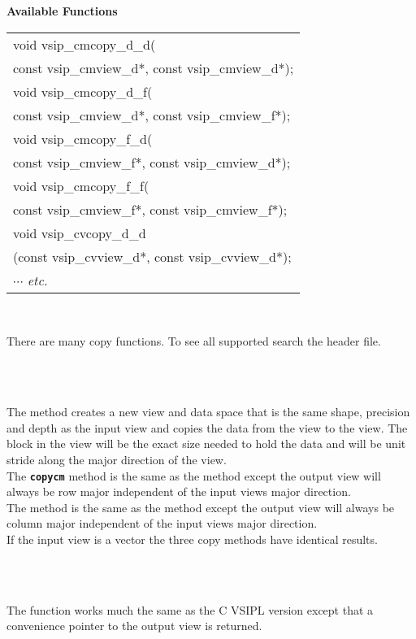 \\\cvsiplh
\\ \hspace*{.8cm} \vspace*{.1cm} \textbf{Available Functions }
\\ \hspace*{1cm} {\ttfamily
\begin{tabular}[H]{l}
void vsip\_cmcopy\_d\_d(\\*
\hspace{1cm}const vsip\_cmview\_d*, const vsip\_cmview\_d*);\\
void vsip\_cmcopy\_d\_f(\\*
\hspace{1cm}const vsip\_cmview\_d*, const vsip\_cmview\_f*);\\
void vsip\_cmcopy\_f\_d(\\*
\hspace{1cm}const vsip\_cmview\_f*, const vsip\_cmview\_d*);\\
void vsip\_cmcopy\_f\_f(\\*
\hspace{1cm}const vsip\_cmview\_f*, const vsip\_cmview\_f*);\\
void vsip\_cvcopy\_d\_d\\*
\hspace{1cm}(const vsip\_cvview\_d*, const vsip\_cvview\_d*);\\
$\cdots$  \emph{etc.} \end{tabular}
}
\\ \hspace*{1cm}
\parbox{11cm}{There are many copy functions. To see all supported search the  header file.\footnotemark}
\\\pyjvsiph
{}
\\\hspace*{1cm}\parbox{11cm}{The  method creates a new view and data space that is the same shape, precision and depth as the input view and copies the data from the  view to the  view. The block in the  view will be the exact size needed to hold the data and will be unit stride along the major direction of the  view.\\The {\texttt{\bfseries{copycm}}} method is the same as the  method except the output view will always be row major independent of the input views major direction.\\The {} method is the same as the  method except the output view will always be column major independent of the input views major direction.\\If the input view is a vector the three copy methods have identical results.}
\\
\\\hspace*{1cm}\parbox{11cm}{The  function works much the same as the C VSIPL version except that a convenience pointer to the output view is returned.}
